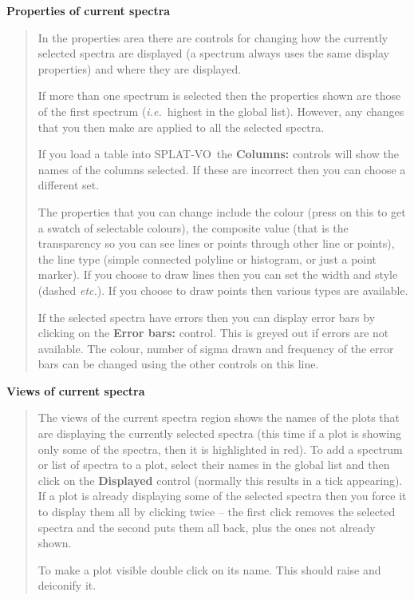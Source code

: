 \documentclass[twoside,11pt,nolof]{starlink}
\providecommand{\SPLAT}{\textsf{SPLAT-VO}}
\newcommand{\labelitem}[1]{\textbf{#1}}
\providecommand{\ie}{\textit{i.e.}}
\providecommand{\etc}{\textit{etc.}}
\providecommand{\subheading}[1]{\textbf{\large{#1}}}
\begin{document}
\subheading{Properties of current spectra}
\begin{quote}
 In the properties area there are controls for changing how the currently
 selected spectra are displayed (a spectrum always uses the same display
 properties) and where they are displayed.

 If more than one spectrum is selected then the properties shown are those of
 the first spectrum (\ie\ highest in the global list). However, any changes
 that you then make are applied to all the selected spectra.

 If you load a table into \SPLAT\ the \labelitem{Columns:} controls will show
 the names of the columns selected. If these are incorrect then you can choose
 a different set.

 The properties that you can change include the colour (press on this to get a
 swatch of selectable colours), the composite value (that is the transparency
 so you can see lines or points through other line or points), the line type
 (simple connected polyline or histogram, or just a point marker). If you
 choose to draw lines then you can set the width and style (dashed \etc). If
 you choose to draw points then various types are available.

 If the selected spectra have errors then you can display error bars by
 clicking on the \labelitem{Error bars:} control. This is greyed out if errors
 are not available. The colour, number of sigma drawn and frequency of the
 error bars can be changed using the other controls on this line.

\end{quote}

\subheading{Views of current spectra}
\begin{quote}
 The views of the current spectra region shows the names of the plots that are
 displaying the currently selected spectra (this time if a plot is showing
 only some of the spectra, then it is highlighted in red). To add a spectrum
 or list of spectra to a plot, select their names in the global list and then
 click on the \labelitem{Displayed} control (normally this results in a tick
 appearing). If a plot is already displaying some of the selected spectra then
 you force it to display them all by clicking twice -- the first click removes
 the selected spectra and the second puts them all back, plus the ones not
 already shown.

 To make a plot visible double click on its name. This should raise and
 deiconify it.
\end{quote}
\end{document}
